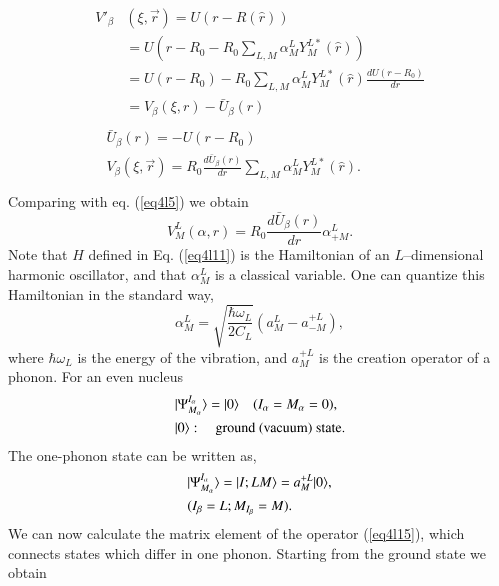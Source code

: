 \begin{subappendices}
\begin{align}\label{eq4l13}
\begin{split}
 V'_\beta & (\xi,\vec r)= U(r-R(\hat r))\\
& = U(r-R_0 -R_0\sum_{L,M} \alpha_M^L Y_M^{L*}(\hat r))\\
& = U(r-R_0) -R_0\sum_{L,M} \alpha_M^L Y_M^{L*}(\hat r) \frac{d U (r-R_0)}{d r}\\
& = V_\beta (\xi, r)- \bar{U}_\beta (r)
\end{split}\\\label{eq4l14}
\begin{split}
& \bar{U}_\beta (r)= -U(r-R_0)\\
& V_\beta (\xi,\vec r)=R_0 \frac{d \bar U_\beta (r)}{d r}\sum_{L,M} \alpha_M^L Y_M^{L*}(\hat r). \\
\end{split}
\end{align}
Comparing with eq. (\ref{eq4l5}) we obtain
\begin{equation}\label{eq4l15}
 V^L_M(\alpha,r)=R_0 \frac{d \bar U_\beta (r)}{d r} \alpha_{+M}^L.
\end{equation}
Note that $H$ defined in Eq. (\ref{eq4l11}) is the Hamiltonian of an $L$--dimensional harmonic oscillator, and that $\alpha_M^L$ is a classical variable. One can quantize this Hamiltonian in the standard way,
\begin{equation}\label{eq4l16}
\alpha_M^L=\sqrt{\frac{\hbar \omega_L}{2 C_L}}(a_M^L-a^{+L}_{-M}),
\end{equation}
where $\hbar \omega_L$  is the energy of the vibration, and $a^{+L}_{M}$ is the creation operator of a phonon. For an even nucleus
\begin{align}\label{eq4l17}
& \vert \Psi^{I_\alpha}_{M_\alpha}\rangle=\vert 0\rangle \quad (I_\alpha=M_\alpha=0),\\
& \vert 0\rangle:\quad \text{ground (vacuum) state}. \notag
\end{align}
The one-phonon state can be written as,
\begin{align}\label{eq4l18}
& \vert \Psi^{I_\alpha}_{M_\alpha}\rangle=\vert I;LM \rangle =a^{+L}_{M} \vert 0\rangle,\\
& (I_\beta=L;M_{I_\beta}=M). \notag
\end{align}
We can now calculate the matrix element of the operator (\ref{eq4l15}), which connects states which differ in one phonon. Starting from the ground state we obtain
\begin{equation}\label{eq4l19}
\begin{split}

\end{split}
\end{equation}
\end{subappendices}
